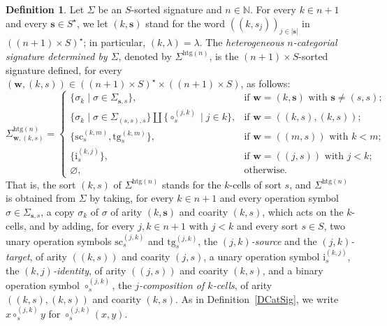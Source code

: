 \documentclass[a4paper, reqno]{amsbook}
\newcommand{\htg}{\mathrm{htg}}                %
\newcommand{\src}{\mathrm{sc}}
\newcommand{\tgt}{\mathrm{tg}}
\theoremstyle{plain}
\theoremstyle{definition}
\newtheorem{definition}[theorem]{Definition}
\begin{document}
\begin{definition}\label{DCatSigHtg}
Let $\Sigma$ be an $S$-sorted signature and $n\in\mathbb{N}$.
For every $k\in n+1$ and every $\mathbf{s}\in S^{\star}$, we let $(k,\mathbf{s})$ stand for the word $((k,s_{j}))_{j\in\lvert\mathbf{s}\rvert}$ in $((n+1)\times S)^{\star}$; in particular, $(k,\lambda)=\lambda$.
The \emph{heterogeneous $n$-categorial signature determined by $\Sigma$}, denoted by $\Sigma^{\htg(n)}$, is the $(n+1)\times S$-sorted signature defined, for every $(\mathbf{w},(k,s))\in((n+1)\times S)^{\star}\times((n+1)\times S)$, as follows:
$$
{\Sigma}^{\htg(n)}_{\mathbf{w},(k,s)}=
\begin{cases}
\{\sigma_{k}\mid\sigma\in{\Sigma}_{\mathbf{s},s}\},
& \text{if $\mathbf{w}=(k,\mathbf{s})$ with $\mathbf{s}\neq(s,s)$;}\\
\{\sigma_{k}\mid\sigma\in{\Sigma}_{(s,s),s}\}\amalg\{\circ^{(j,k)}_{s}\mid j\in k\},
& \text{if $\mathbf{w}=((k,s),(k,s))$;}\\
\{\src^{(k,m)}_{s}, \tgt^{(k,m)}_{s}\},
& \text{if $\mathbf{w}=((m,s))$ with $k<m$;}\\
\{\mathrm{i}^{(k,j)}_{s}\},
& \text{if $\mathbf{w}=((j,s))$ with $j<k$;}\\
\varnothing,
& \text{otherwise.}
\end{cases}
$$
That is, the sort $(k,s)$ of ${\Sigma}^{\htg(n)}$ stands for the $k$-cells of sort $s$, and ${\Sigma}^{\htg(n)}$ is obtained from $\Sigma$ by taking, for every $k\in n+1$ and every operation symbol $\sigma\in\Sigma_{\mathbf{s},s}$, a copy $\sigma_{k}$ of $\sigma$ of arity $(k,\mathbf{s})$ and coarity $(k,s)$, which acts on the $k$-cells, and by adding, for every $j,k\in n+1$ with $j<k$ and every sort $s\in S$, two unary operation symbols $\src^{(j,k)}_{s}$ and $\tgt^{(j,k)}_{s}$, the \emph{$(j,k)$-source} and the \emph{$(j,k)$-target}, of arity $((k,s))$ and coarity $(j,s)$, a unary operation symbol $\mathrm{i}^{(k,j)}_{s}$, the \emph{$(k,j)$-identity}, of arity $((j,s))$ and coarity $(k,s)$, and a binary operation symbol $\circ^{(j,k)}_{s}$, the \emph{$j$-composition of $k$-cells}, of arity $((k,s),(k,s))$ and coarity $(k,s)$.
As in Definition~\ref{DCatSig}, we write $x\circ^{(j,k)}_{s}y$ for $\circ^{(j,k)}_{s}(x,y)$.


\end{definition}
\end{document}
